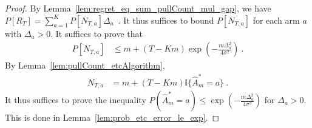 \begin{proof}\leanok
By Lemma~\ref{lem:regret_eq_sum_pullCount_mul_gap}, we have $P[R_T] = \sum_{a=1}^K P\left[N_{T,a}\right] \Delta_a$~.
It thus suffices to bound $P[N_{T,a}]$ for each arm $a$ with $\Delta_a > 0$.
It suffices to prove that
\begin{align*}
  P[N_{T,a}]
  &\le m + (T - Km) \exp\left(- \frac{m \Delta_a^2}{4 \sigma^2}\right)
  \: .
\end{align*}
By Lemma~\ref{lem:pullCount_etcAlgorithm},
\begin{align*}
  N_{T,a}
  &= m + (T - Km) \mathbb{I}\{\hat{A}_m^* = a\}
  \: .
\end{align*}
It thus suffices to prove the inequality $P(\hat{A}_m^* = a) \le \exp\left(- \frac{m \Delta_a^2}{4 \sigma^2}\right)$ for $\Delta_a > 0$.
This is done in Lemma~\ref{lem:prob_etc_error_le_exp}.
\end{proof}
